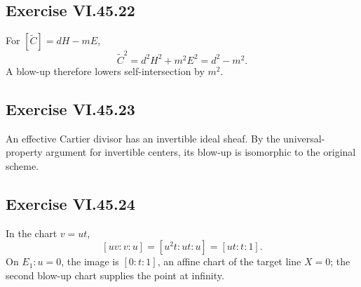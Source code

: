 \subsection*{Exercise VI.45.22}
\begin{solution}
For \([\widetilde C]=dH-mE\),
\[
\widetilde C^2=d^2H^2+m^2E^2=d^2-m^2.
\]
A blow-up therefore lowers self-intersection by \(m^2\).
\end{solution}

\subsection*{Exercise VI.45.23}
\begin{solution}
An effective Cartier divisor has an invertible ideal sheaf.  By the universal-property argument for invertible centers, its blow-up is isomorphic to the original scheme.
\end{solution}

\subsection*{Exercise VI.45.24}
\begin{solution}
In the chart \(v=ut\),
\[
[uv:v:u]=[u^2t:ut:u]=[ut:t:1].
\]
On \(E_1:u=0\), the image is \([0:t:1]\), an affine chart of the target line \(X=0\); the second blow-up chart supplies the point at infinity.
\end{solution}

